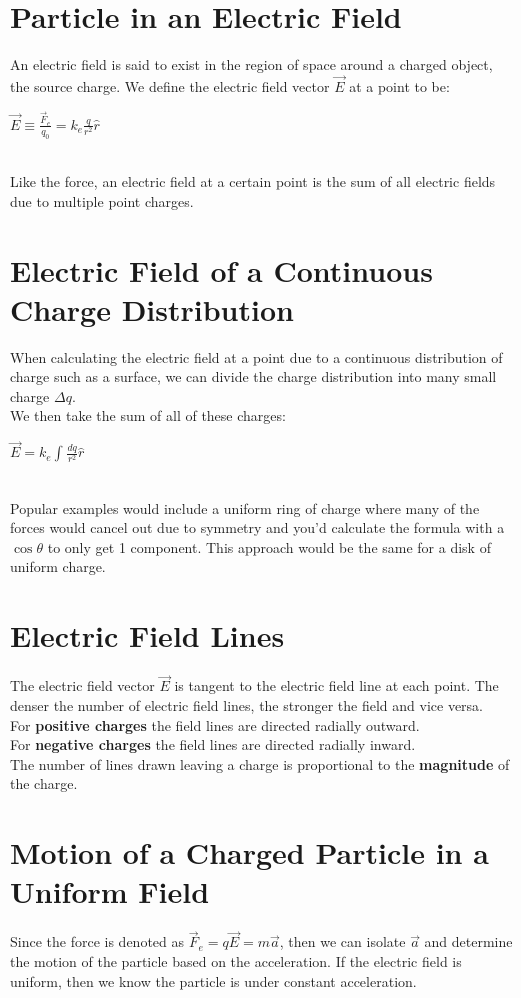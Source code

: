 \documentclass[12pt]{report}
\begin{document}
	\section{Particle in an Electric Field}
		An electric field is said to exist in the region of space around a charged object, the source charge. We define the electric field vector $\vec{E}$ at a point to be:\\
		\centerline{$\vec{E} \equiv \frac{\vec{F}_e}{q_0} = k_e \frac{q}{r^2}\hat{r}$}\\
		Like the force, an electric field at a certain point is the sum of all electric fields due to multiple point charges.
	\section{Electric Field of a Continuous Charge Distribution}
		When calculating the electric field at a point due to a continuous distribution of charge such as a surface, we can divide the charge distribution into many small charge $\Delta q$.\\
		We then take the sum of all of these charges:\\
		\centerline{$\vec{E} = k_e \int_{}^{} \frac{dq}{r^2} \hat{r}$} \\
		Popular examples would include a uniform ring of charge where many of the forces would cancel out due to symmetry and you'd calculate the formula with a $\cos \theta$ to only get 1 component. This approach would be the same for a disk of uniform charge.
	\section{Electric Field Lines}
		The electric field vector $\vec{E}$ is tangent to the electric field line at each point. The denser the number of electric field lines, the stronger the field and vice versa.\\
		For \textbf{positive charges} the field lines are directed radially outward.\\
		For \textbf{negative charges} the field lines are directed radially inward.\\
		The number of lines drawn leaving a charge is proportional to the \textbf{magnitude} of the charge.
	\section{Motion of a Charged Particle in a Uniform Field}
		Since the force is denoted as $\vec{F}_e = q\vec{E} = m\vec{a}$, then we can isolate $\vec{a}$ and determine the motion of the particle based on the acceleration. If the electric field is uniform, then we know the particle is under constant acceleration.
\end{document}
